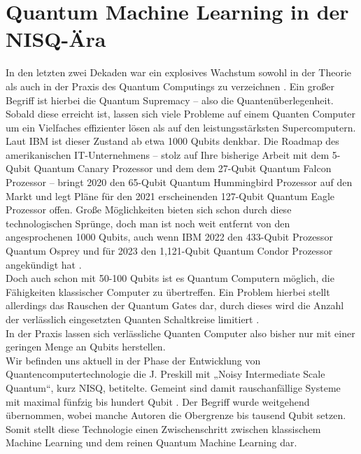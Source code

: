 
\section{Quantum Machine Learning in der NISQ-Ära}
\label{sec:nisq}

In den letzten zwei Dekaden war ein explosives Wachstum sowohl in der Theorie als auch in der Praxis des Quantum Computings zu verzeichnen \cite{quantummethodssupervised1}. Ein großer Begriff ist hierbei die Quantum Supremacy – also die Quantenüberlegenheit. Sobald diese erreicht ist, lassen sich viele Probleme auf einem Quanten Computer um ein Vielfaches effizienter lösen als auf den leistungsstärksten Supercomputern. Laut IBM ist dieser Zustand ab etwa 1000 Qubits denkbar. Die Roadmap des amerikanischen IT-Unternehmens – stolz auf Ihre bisherige Arbeit mit dem 5-Qubit Quantum Canary Prozessor und dem dem 27-Qubit Quantum Falcon Prozessor – bringt 2020 den 65-Qubit Quantum Hummingbird Prozessor auf den Markt und legt Pläne für den 2021 erscheinenden 127-Qubit Quantum Eagle Prozessor offen. Große Möglichkeiten bieten sich schon durch diese technologischen Sprünge, doch man ist noch weit entfernt von den angesprochenen 1000 Qubits, auch wenn IBM 2022 den 433-Qubit Prozessor Quantum Osprey und für 2023 den 1,121-Qubit Quantum Condor Prozessor angekündigt hat \cite{roadmapIBM}.  \\


Doch auch schon mit 50-100 Qubits ist es Quantum Computern möglich, die Fähigkeiten klassischer Computer zu übertreffen. Ein Problem hierbei stellt allerdings das Rauschen der Quantum Gates dar, durch dieses wird die Anzahl der verlässlich eingesetzten Quanten Schaltkreise limitiert  \cite{preskill2018quantum}.\\

In der Praxis lassen sich verlässliche Quanten Computer also bisher nur mit einer geringen Menge an Qubits herstellen. \\
Wir befinden uns aktuell in der Phase der Entwicklung von Quantencomputertechnologie die J. Preskill mit „Noisy Intermediate Scale Quantum“, kurz NISQ, betitelte. Gemeint sind damit rauschanfällige Systeme mit maximal fünfzig bis hundert Qubit \cite{preskill2018quantum}.  Der Begriff wurde weitgehend übernommen, wobei manche Autoren die Obergrenze bis tausend Qubit setzen. Somit stellt diese Technologie einen Zwischenschritt zwischen klassischem Machine Learning und dem reinen Quantum Machine Learning dar.

